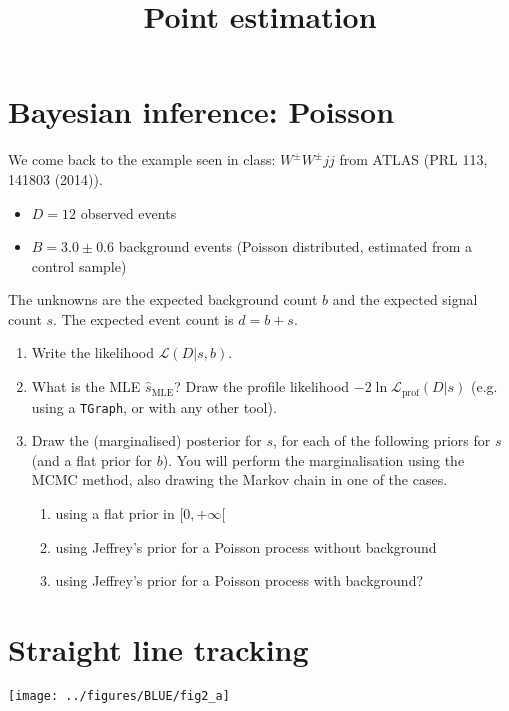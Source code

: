 \documentclass[a4paper,12pt]{article}
\title{Point estimation}
\author{}
\date{}
\begin{document}
 \maketitle
 
 \section{Bayesian inference: Poisson}
 
 We come back to the example seen in class: $W^\pm W^\pm jj$ from ATLAS (PRL 113, 141803 (2014)).
 \begin{itemize}
  \item $D = 12$ observed events
  \item $B = 3.0 \pm 0.6$ background events (Poisson distributed, estimated from a control sample)
 \end{itemize}

 The unknowns are the expected background count $b$ and the expected signal count $s$. The expected event count is $d = b+s$.
 
 \begin{enumerate}
  \item Write the likelihood $\mathcal{L}(D | s,b)$.
  \item What is the MLE $\hat{s}_\text{MLE}$? Draw the profile likelihood $-2\ln\mathcal{L}_\text{prof}(D|s)$ (e.g. using a \texttt{TGraph}, or with any other tool).
  \item Draw the (marginalised) posterior for $s$, for each of the following priors for $s$ (and a flat prior for $b$). You will perform the marginalisation using the MCMC method, also
  drawing the Markov chain in one of the cases. 
  \begin{enumerate}
   \item using a flat prior in $[0,+\infty[$
   \item using Jeffrey's prior for a Poisson process without background
   \item using Jeffrey's prior for a Poisson process with background?
  \end{enumerate}
 \end{enumerate}
 
 \section{Straight line tracking}
 
 \begin{center}
  \texttt{[image: ../figures/BLUE/fig2\_a]}
 \end{center}
\end{document}
